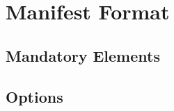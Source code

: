 \documentclass[0-thesis.tex]{subfiles}
\begin{document}

\section{Manifest Format}
\label{sec:manifest-format}

\subsection{Mandatory Elements}
\label{ssec:mandatory-elements}

\subsection{Options}
\label{ssec:options}
\end{document}
